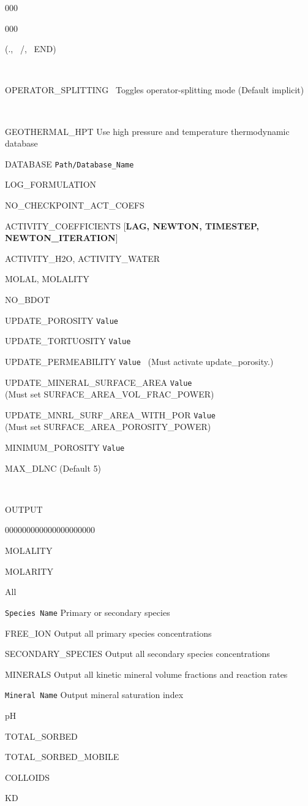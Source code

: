 \documentclass[12pt]{article}
\newcommand\keyend{{(., \, /, \, END)}}
\begin{document}
\begin{deflist}{000}
\begin{deflist}{000}
\item [\keyend]

~\\

\item [OPERATOR\_SPLITTING] \ Toggles operator-splitting mode (Default implicit)

~\\

\item[GEOTHERMAL\_HPT] Use high pressure and temperature thermodynamic database
\item[DATABASE] {\tt Path/Database\_Name}
\item[LOG\_FORMULATION]
\item[NO\_CHECKPOINT\_ACT\_COEFS]
\item[ACTIVITY\_COEFFICIENTS] [{\bf LAG, NEWTON, TIMESTEP, NEWTON\_ITERATION}]
\item[ACTIVITY\_H2O, ACTIVITY\_WATER]
\item[MOLAL, MOLALITY]
\item[NO\_BDOT]
\item[UPDATE\_POROSITY] {\tt Value}
\item[UPDATE\_TORTUOSITY] {\tt Value}
\item[UPDATE\_PERMEABILITY] {\tt Value} \ (Must activate update\_porosity.)
\item[UPDATE\_MINERAL\_SURFACE\_AREA] {\tt Value} \\
(Must set SURFACE\_AREA\_VOL\_FRAC\_POWER)
\item[UPDATE\_MNRL\_SURF\_AREA\_WITH\_POR] {\tt Value} \\
(Must set SURFACE\_AREA\_POROSITY\_POWER)
\item[MINIMUM\_POROSITY] {\tt Value}
\item[MAX\_DLNC] \rm (Default 5)

~\\

\item[OUTPUT] ~
\begin{deflist}{000000000000000000000}
\item[MOLALITY]
\item[MOLARITY]
\item[All]
\item[\tt Species Name] Primary or secondary species
\item[FREE\_ION] Output all primary species concentrations
\item[SECONDARY\_SPECIES] Output all secondary species concentrations
\item[MINERALS] Output all kinetic mineral volume fractions and reaction rates
\item[\tt Mineral Name] Output mineral saturation index
\item[pH]
\item[TOTAL\_SORBED]
\item[TOTAL\_SORBED\_MOBILE]
\item[COLLOIDS]
\item[KD]
\end{deflist}


\end{deflist}
\end{deflist}
\end{document}
